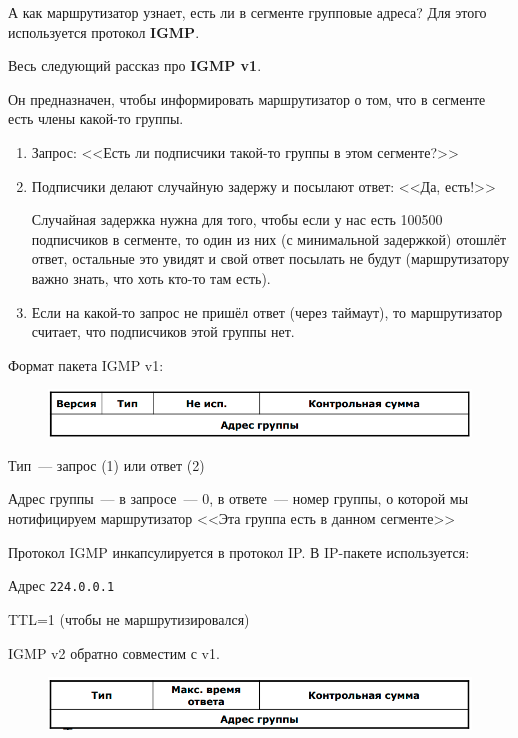 А как маршрутизатор узнает, есть ли в сегменте групповые адреса? Для этого используется протокол {\bf IGMP}.

Весь следующий рассказ про {\bf IGMP v1}.

Он предназначен, чтобы информировать маршрутизатор о том, что в сегменте есть члены какой-то группы.

\begin{enumerate}
    \item Запрос: <<Есть ли подписчики такой-то группы в этом сегменте?>>
    \item Подписчики делают случайную задержу и посылают ответ: <<Да, есть!>>

    Случайная задержка нужна для того, чтобы если у нас есть 100500 подписчиков в сегменте, то один из них (с минимальной задержкой) отошлёт ответ, остальные это увидят и свой ответ посылать не будут (маршрутизатору важно знать, что хоть кто-то там есть).
    \item Если на какой-то запрос не пришёл ответ (через таймаут), то маршрутизатор считает, что подписчиков этой группы нет.
\end{enumerate}

Формат пакета IGMP v1:

\begin{figure}[H]
  \centering
  \includegraphics[width=15cm]{images/02/07}
\end{figure}

\begin{MyItemize}
    \item Тип~--- запрос (1) или ответ (2)
    \item Адрес группы~--- в запросе~--- 0, в ответе~--- номер группы, о которой мы нотифицируем маршрутизатор <<Эта группа есть в данном сегменте>>
\end{MyItemize}

Протокол IGMP инкапсулируется в протокол IP. В IP-пакете используется:
\begin{MyItemize}
    \item Адрес {\tt 224.0.0.1}
    \item TTL=1 (чтобы не маршрутизировался)
\end{MyItemize}

IGMP v2 обратно совместим с v1.

\begin{figure}[H]
  \centering
  \includegraphics[width=15cm]{images/02/08}
\end{figure}

